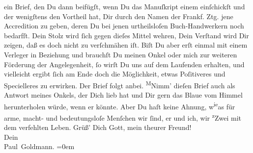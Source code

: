 \begin{ledgroupsized}[t]{13cm}
               ein Brief, den Du dann beifügſt, wenn Du das Manuſkript einem \label{K_L02709-6v}\label{K_L02709-6h} einſchickſt und der wenigſtens den Vortheil hat, Dir durch
               den Namen der Frankf. Ztg. jene Accredition zu
               geben, deren Du bei jenen urtheilsloſen Buch-Handwerkern noch bedarfſt. Dein Stolz
               wird ſich gegen dieſes Mittel wehren, Dein Verſtand wird Dir zeigen, daß es doch {\pb}nicht zu verſchmähen iſt. Biſt Du aber erſt einmal
               mit einem Verleger in Beziehung und brauchſt Du meinen Onkel oder mich zur weiteren Förderung der
               Angelegenheit, ſo wirſt Du uns auf dem Laufenden erhalten, und vielleicht ergibt ſich
               am Ende doch die Möglichkeit, etwas Poſitiveres und Specielleres zu erwirken.\pend
           \pstart
           Der Brief folgt anbei.\pend
           \pstart
           {\pb}\substVorne{}\textsuperscript{M}\substDazwischen{}N\substHinten{}imm' dieſen Brief auch als Antwort meines Onkels, der Dich lieb hat und Dir gern das Blaue vom Himmel
               herunterholen würde, wenn er könnte. Aber Du haſt keine Ahnung, w\substVorne{}\textsuperscript{ie}\substDazwischen{}a\substHinten{}s für arme, macht- und bedeutungsloſe Menſchen wir ſind, er und ich, wir \substVorne{}\textsuperscript{z}\substDazwischen{}Z\substHinten{}wei mit dem verfehlten Leben.\pend
           \pstart
           Grüß’ Dich Gott, mein theurer Freund! {\\[\baselineskip]}Dein {\\[\baselineskip]}\spacefill\mbox{Paul Goldmann.}\pend
           \leftskip=0em{}
         
         \endnumbering{}\end{ledgroupsized}  \newcommand{\dateiname}{L02709}\newcommand{\titel}{Paul Goldmann an Arthur Schnitzler, 3. 6. 1893}\newcommand{\editorInnen}{Martin Anton Müller und Laura Untner}
      